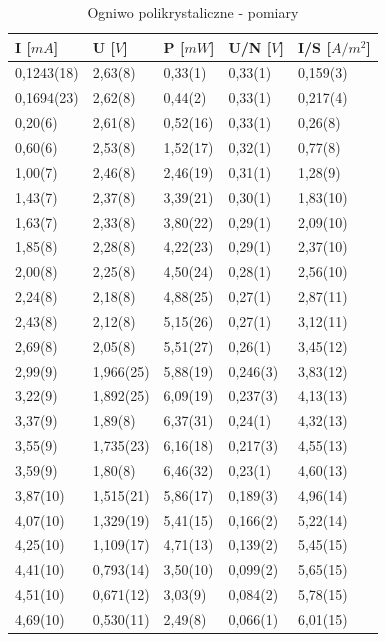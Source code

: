 \documentclass[12pt,a4paper]{article}
\begin{document}
\begin{table}[H]
\centering
\caption{Ogniwo polikrystaliczne - pomiary}
\label{poliwyniki}
\begin{tabular}{|p{2cm}|p{2cm}|p{2cm}|p{2cm}|p{2cm}|}
\hline
I {[}$mA${]}	& U {[}$V${]}	& P  {[}$mW${]}	& U/N {[}$V${]}	& I/S {[}$A/m^2${]} \\
\hline
0,1243(18)		& 2,63(8)		& 0,33(1)		& 0,33(1)		& 0,159(3)\\
0,1694(23)		& 2,62(8)		& 0,44(2)		& 0,33(1)		& 0,217(4)\\
0,20(6)			& 2,61(8)		& 0,52(16)		& 0,33(1)		& 0,26(8)\\
0,60(6)			& 2,53(8)		& 1,52(17)		& 0,32(1)		& 0,77(8)\\
1,00(7)			& 2,46(8)		& 2,46(19)		& 0,31(1)		& 1,28(9)\\
1,43(7)			& 2,37(8)		& 3,39(21)		& 0,30(1)		& 1,83(10)\\
1,63(7)			& 2,33(8)		& 3,80(22)		& 0,29(1)		& 2,09(10)\\
1,85(8)			& 2,28(8)		& 4,22(23)		& 0,29(1)		& 2,37(10)\\
2,00(8)			& 2,25(8)		& 4,50(24)		& 0,28(1)		& 2,56(10)\\
2,24(8)			& 2,18(8)		& 4,88(25)		& 0,27(1)		& 2,87(11)\\
2,43(8)			& 2,12(8)		& 5,15(26)		& 0,27(1)		& 3,12(11)\\
2,69(8)			& 2,05(8)		& 5,51(27)		& 0,26(1)		& 3,45(12)\\
2,99(9)			& 1,966(25)		& 5,88(19)		& 0,246(3)		& 3,83(12)\\
3,22(9)			& 1,892(25)		& 6,09(19)		& 0,237(3)		& 4,13(13)\\
3,37(9)			& 1,89(8)		& 6,37(31)		& 0,24(1)		& 4,32(13)\\
3,55(9)			& 1,735(23)		& 6,16(18)		& 0,217(3)		& 4,55(13)\\
3,59(9)			& 1,80(8)		& 6,46(32)		& 0,23(1)		& 4,60(13)\\
3,87(10)		& 1,515(21)		& 5,86(17)		& 0,189(3)		& 4,96(14)\\
4,07(10)		& 1,329(19)		& 5,41(15)		& 0,166(2)		& 5,22(14)\\
4,25(10)		& 1,109(17)		& 4,71(13)		& 0,139(2)		& 5,45(15)\\
4,41(10)		& 0,793(14)		& 3,50(10)		& 0,099(2)		& 5,65(15)\\
4,51(10)		& 0,671(12)		& 3,03(9)		& 0,084(2)		& 5,78(15)\\
4,69(10)		& 0,530(11)		& 2,49(8)		& 0,066(1)		& 6,01(15)\\
\hline
\end{tabular}
\end{table}
\end{document}
